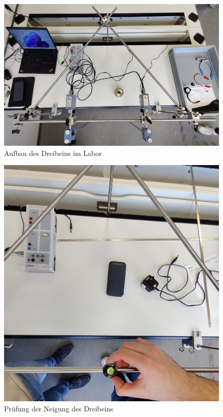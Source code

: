 \begin{figure}[H]
	\centering
	\includegraphics[width=1\textwidth]{Aufbau_Dreibein.jpg}
	\caption{Aufbau des Dreibeins im Labor}
	\label{fig:Aufbau_Dreibein}
\end{figure}
\begin{figure}[H]
	\centering
	\includegraphics[width=1\textwidth]{tarierung_dreibein.jpg}
	\caption{Prüfung der Neigung des Dreibeins}
	\label{fig:tarierung_dreibein}
\end{figure}
